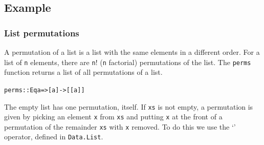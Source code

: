 \subsection*{Example}
\subsubsection*{List permutations}

A permutation of a list is a list with the 
same elements in a different order. For a list of \texttt{n} elements, there are \texttt{n\ensuremath{!}} (\texttt{n} factorial) permutations of the list. The \texttt{perms} function returns a list
of all permutations of a list.
\begin{alltt} 
perms :: Eq a => [a] -> [[a]]
\end{alltt}
The empty list has one permutation, 
itself. If \texttt{xs} is not empty, a permutation is given by 
picking an element \texttt{x} from \texttt{xs} and 
putting \texttt{x} at the front of a permutation of the 
remainder \texttt{xs} with \texttt{x} removed. To do this we use the `\texttt{\bs{}\bs{}}' operator, defined in \texttt{Data.List}.

